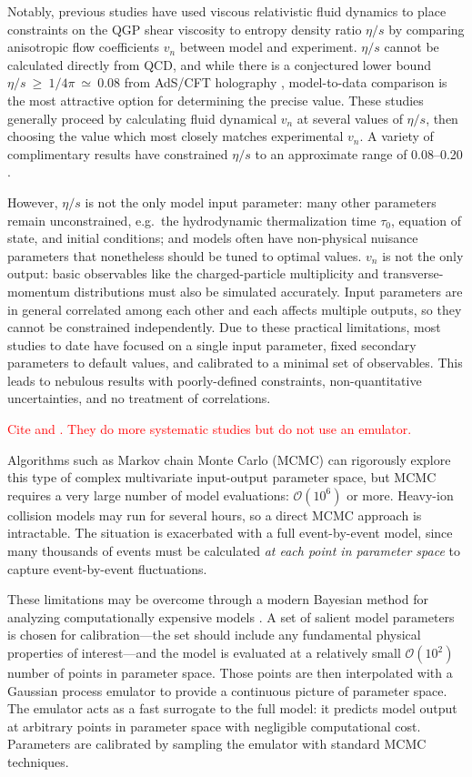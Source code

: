 \documentclass[aps,prc,reprint,amsmath]{revtex4-1}
\newcommand{\todo}[1]{\textcolor{red}{#1}}
\begin{document}
Notably, previous studies have used viscous relativistic fluid dynamics to place constraints on the QGP shear viscosity to entropy density ratio $\eta/s$ by comparing anisotropic flow coefficients $v_n$ between model and experiment.
$\eta/s$ cannot be calculated directly from QCD, and while there is a conjectured lower bound $\eta/s~\geq~1/4\pi~\simeq~0.08$ from AdS/CFT holography \cite{Kovtun:2004de}, model-to-data comparison is the most attractive option for determining the precise value.
These studies generally proceed by calculating fluid dynamical $v_n$ at several values of $\eta/s$, then choosing the value which most closely matches experimental $v_n$.
A variety of complimentary results have constrained $\eta/s$ to an approximate range of 0.08--0.20 \cite{Luzum:2008cw,Song:2010mg,Schenke:2010rr}.

However, $\eta/s$ is not the only model input parameter:
many other parameters remain unconstrained, e.g.~the hydrodynamic thermalization time $\tau_0$, equation of state, and initial conditions; and models often have non-physical nuisance parameters that nonetheless should be tuned to optimal values.
$v_n$ is not the only output:
basic observables like the charged-particle multiplicity and transverse-momentum distributions must also be simulated accurately.
Input parameters are in general correlated among each other and each affects multiple outputs, so they cannot be constrained independently.
Due to these practical limitations, most studies to date have focused on a single input parameter, fixed secondary parameters to default values, and calibrated to a minimal set of observables.
This leads to nebulous results with poorly-defined constraints, non-quantitative uncertainties, and no treatment of correlations.

\todo{
  Cite \cite{Luzum:2012wu} and \cite{Soltz:2012rk}.
  They do more systematic studies but do not use an emulator.
}

Algorithms such as Markov chain Monte Carlo (MCMC) can rigorously explore this type of complex multivariate input-output parameter space, but MCMC requires a very large number of model evaluations: $\mathcal O(10^6)$ or more.
Heavy-ion collision models may run for several hours, so a direct MCMC approach is intractable.
The situation is exacerbated with a full event-by-event model, since many thousands of events must be calculated \emph{at each point in parameter space} to capture event-by-event fluctuations.

These limitations may be overcome through a modern Bayesian method for analyzing computationally expensive models \cite{OHagan:2006ba,Higdon:2008cmc,Higdon:2014tva}.
A set of salient model parameters is chosen for calibration---the set should include any fundamental physical properties of interest---and the model is evaluated at a relatively small $\mathcal O(10^2)$ number of points in parameter space.
Those points are then interpolated with a Gaussian process emulator \cite{Rasmussen:2006gp} to provide a continuous picture of parameter space.
The emulator acts as a fast surrogate to the full model:
it predicts model output at arbitrary points in parameter space with negligible computational cost.
Parameters are calibrated by sampling the emulator with standard MCMC techniques.
\end{document}

